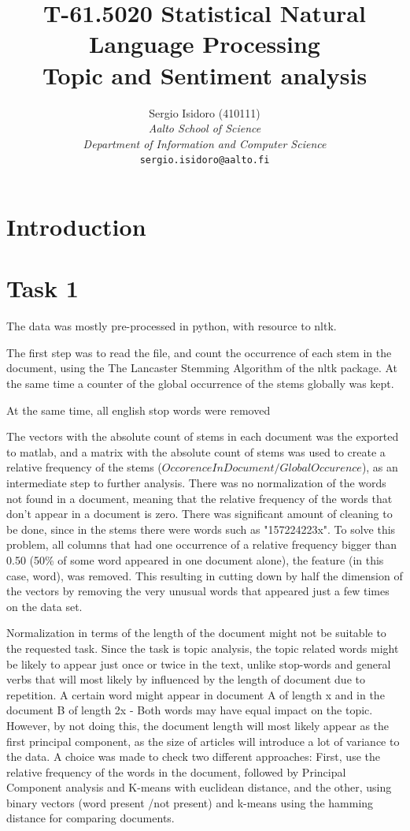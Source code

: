 \documentclass[a4paper,10pt]{article}
\title{T-61.5020 Statistical Natural Language Processing  \\ Topic and Sentiment analysis}
\author{Sergio Isidoro (410111)\\
	   \textit{Aalto School of Science} \\ \textit{Department of Information and Computer Science}\\ 	   
       {\tt sergio.isidoro@aalto.fi}}
\begin{document}
\maketitle

\section{Introduction}



\section{Task 1}

The data was mostly pre-processed in python, with resource to nltk.\

The first step was to read the file, and count the occurrence of each stem in the document, using the The Lancaster Stemming Algorithm of the nltk package. At the same time a counter of the global occurrence of the stems globally was kept.

At the same time, all english stop words were removed 

The vectors with the absolute count of stems in each document was the exported to matlab, and a matrix with the absolute count of stems was used to create a relative frequency of the stems ($OccorenceInDocument/GlobalOccurence$), as an intermediate step to further analysis. There was no normalization of the words not found in a document, meaning that the relative frequency of the words that don't appear in a document is zero. There was significant amount of cleaning to be done, since in the stems there were words such as "157224223x". To solve this problem, all columns that had one occurrence of a relative frequency bigger than 0.50 (50\% of some word appeared in one document alone), the feature (in this case, word), was removed. This resulting in cutting down by half the dimension of the vectors by removing the very unusual words that appeared just a few times on the data set.

Normalization in terms of the length of the document might not be suitable to the requested task. Since the task is topic analysis, the topic related words might be likely to appear just once or twice in the text, unlike stop-words and general verbs that will most likely by influenced by the length of document due to repetition. A certain word might appear in document A of length x and in the document B of length 2x - Both words may have equal impact on the topic. However, by not doing this, the document length will most likely appear as the first principal component, as the size of articles will introduce a lot of variance to the data. A choice was made to check two different approaches: First, use the relative frequency of the words in the document, followed by Principal Component analysis and K-means with euclidean distance, and the other, using binary vectors (word present /not present) and k-means using the hamming distance for comparing documents.
\end{document}
